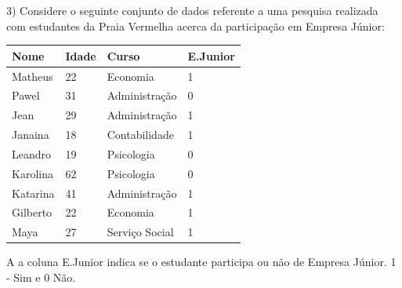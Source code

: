 \documentclass[12pt]{article}
\begin{document}
3) Considere o seguinte conjunto de dados referente a uma pesquisa realizada com estudantes da Praia Vermelha acerca da participação em Empresa Júnior:

\begin{table}[H]
\centering
\begin{tabular}{llll}
\hline
Nome     & Idade & Curso          & E.Junior \\ \hline
Matheus  & 22    & Economia       & 1        \\
Pawel    & 31    & Administração  & 0        \\
Jean     & 29    & Administração  & 1        \\
Janaina  & 18    & Contabilidade  & 1        \\
Leandro  & 19    & Psicologia     & 0        \\
Karolina & 62    & Psicologia     & 0        \\
Katarina & 41    & Administração  & 1        \\
Gilberto & 22    & Economia       & 1        \\
Maya     & 27    & Serviço Social & 1        \\ \hline
\end{tabular}
\end{table}

A a coluna E.Junior indica se o estudante participa ou não de Empresa Júnior. 1 - Sim e 0 Não.
\end{document}
